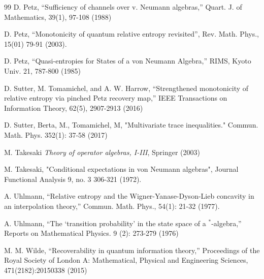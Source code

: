 \documentclass[english,a4paper,12pt]{article}
\begin{document}
\begin{thebibliography}{99}
D. Petz, ``Sufficiency of channels over v. Neumann algebras,'' Quart. J. of Mathematics, 39(1), 97-108 (1988)

D. Petz, ``Monotonicity of quantum relative entropy revisited'', Rev. Math. Phys., 15(01) 79-91 (2003). 

D. Petz, ``Quasi-entropies for States of a von Neumann Algebra,''  RIMS, Kyoto Univ.
21, 787-800 (1985)

D. Sutter, M. Tomamichel, and A. W. Harrow, ``Strengthened monotonicity of relative entropy via pinched Petz recovery map,'' 
IEEE Transactions on Information Theory, 62(5), 2907-2913 (2016) 

D. Sutter,  Berta, M., Tomamichel, M,  "Multivariate trace inequalities." Commun.  Math. Phys. 352(1): 37-58  (2017)

  M. Takesaki {\it Theory of operator algebras, I-III}, Springer (2003)
  
  M. Takesaki, "Conditional expectations in von Neumann algebras", Journal Functional Analysis 9, no. 3  306-321 (1972).
 
 A. Uhlmann, ``Relative entropy and the Wigner-Yanase-Dyson-Lieb concavity in an interpolation theory,''
 Commun. Math. Phys., 54(1): 21-32 (1977). 
  
 A. Uhlmann, ``The `transition probability' in the state space of a $^*$-algebra,'' Reports on Mathematical Physics. 9 (2): 273-279 (1976)
  
  M. M. Wilde, ``Recoverability in quantum information theory,'' Proceedings of the Royal Society of London A: Mathematical, Physical and Engineering Sciences, 471(2182):20150338 (2015)
  


\end{thebibliography}
\end{document}
